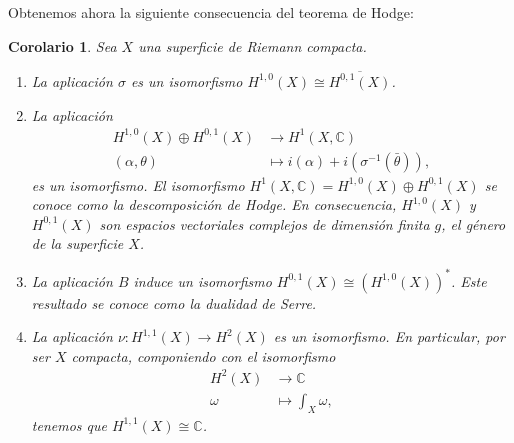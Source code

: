 \documentclass[12pt,a4paper]{article}
\newtheorem{corol}[thm]{Corolario}
\theoremstyle{definition} \newtheorem{defn}[thm]{Definición}
\theoremstyle{definition} \newtheorem{ejemplo}[thm]{Ejemplo}
\theoremstyle{definition} \newtheorem{ejercicio}[thm]{Ejercicio}
\def\CC{\mathbb{C}}
\begin{document}
      Obtenemos ahora la siguiente consecuencia del teorema de Hodge:
      \begin{corol}
	Sea $X$ una superficie de Riemann compacta.
	\begin{enumerate}
	  \item La aplicación $\sigma$ es un isomorfismo $H^{1,0}(X) \cong \overline{H^{0,1}(X)}$.
	  \item La aplicación
	    \begin{align*}
	      H^{1,0}(X) \oplus H^{0,1}(X)&\longrightarrow H^1(X,\CC)\\ 
	      (\alpha,\theta) &\longmapsto i(\alpha) + i(\sigma^{-1}(\bar{\theta})), 
	      \end{align*}
	      es un isomorfismo. El isomorfismo $H^1(X,\CC)=H^{1,0}(X) \oplus H^{0,1}(X)$ se conoce como la \emph{descomposición de Hodge}. En consecuencia, $H^{1,0}(X)$ y $H^{0,1}(X)$ son espacios vectoriales complejos de dimensión finita $g$, el género de la superficie $X$.
	  \item La aplicación $B$ induce un isomorfismo  $H^{0,1}(X) \cong (H^{1,0}(X))^*$. Este resultado se conoce como la \emph{dualidad de Serre}.
	    \item La aplicación $\nu:H^{1,1}(X) \rightarrow H^2(X)$ es un isomorfismo. En particular, por ser $X$ compacta, componiendo con el isomorfismo
	      \begin{align*}
		 H^2(X)&\longrightarrow \CC \\ 
		  \omega &\longmapsto  \int_X \omega,
		\end{align*}
		tenemos que $H^{1,1}(X)\cong \CC$.
	\end{enumerate}
      \end{corol}
\end{document}
